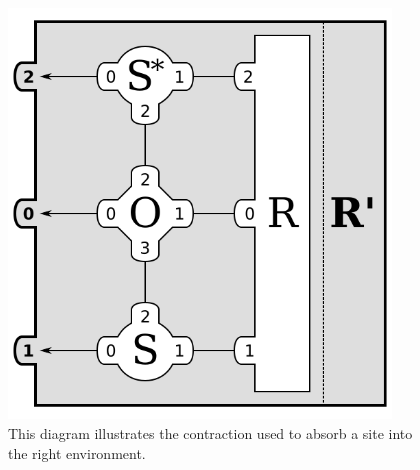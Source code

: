 \documentclass{article}
\newcommand{\diagramwidth}{4in}
\begin{document}
\begin{figure}\begin{center}
\includegraphics[width=\diagramwidth]{drawings/contractSOSRight-car}
\caption{\label{fig:contractSOSRight-car}This diagram illustrates the contraction used to absorb a site into the right environment.}
\end{center}\end{figure}
\end{document}
